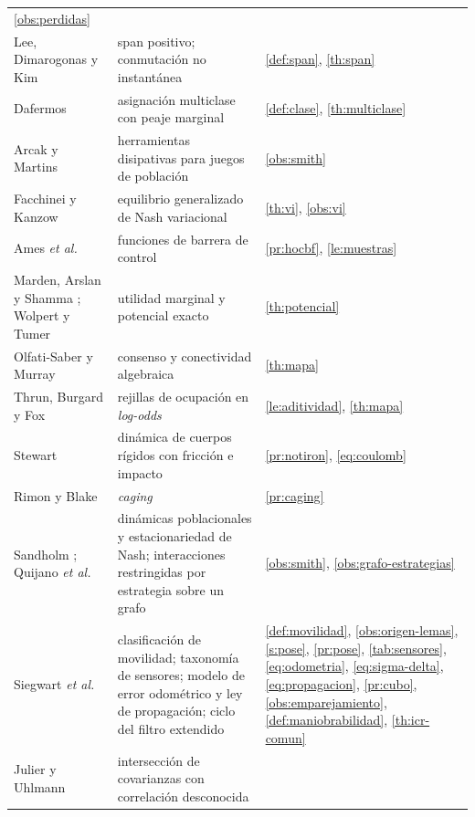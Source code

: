 \begin{table}[!ht]
\begin{tabularx}{\textwidth}{@{}p{4.6cm}p{3.5cm}X@{}}
    \cref{obs:perdidas} \\
Lee, Dimarogonas y Kim \cite{lee2026switching}
  & span positivo; conmutación no instantánea
  & \cref{def:span}, \cref{th:span} \\
Dafermos \cite{dafermos1972multiclass}
  & asignación multiclase con peaje marginal
  & \cref{def:clase}, \cref{th:multiclase} \\
Arcak y Martins \cite{arcak2021dissipativity}
  & herramientas disipativas para juegos de población
  & \cref{obs:smith} \\
Facchinei y Kanzow \cite{facchinei2007gne}
  & equilibrio generalizado de Nash variacional
  & \cref{th:vi}, \cref{obs:vi} \\
Ames \emph{et al.} \cite{ames2017cbf}
  & funciones de barrera de control
  & \cref{pr:hocbf}, \cref{le:muestras} \\
Marden, Arslan y Shamma \cite{marden2009cooperative};
Wolpert y Tumer \cite{wolpert1999collective}
  & utilidad marginal y potencial exacto
  & \cref{th:potencial} \\
Olfati-Saber y Murray \cite{olfatiSaber2004consensus}
  & consenso y conectividad algebraica
  & \cref{th:mapa} \\
Thrun, Burgard y Fox \cite{thrun2005probabilistic}
  & rejillas de ocupación en \emph{log-odds}
  & \cref{le:aditividad}, \cref{th:mapa} \\
Stewart \cite{stewart2000rigid}
  & dinámica de cuerpos rígidos con fricción e impacto
  & \cref{pr:notiron}, \eqref{eq:coulomb} \\
Rimon y Blake \cite{rimon1996caging}
  & \emph{caging}
  & \cref{pr:caging} \\
Sandholm \cite{sandholm2010population}; Quijano \emph{et al.} \cite{quijano2017role}
  & dinámicas poblacionales y estacionariedad de Nash; interacciones restringidas
    por estrategia sobre un grafo
  & \cref{obs:smith}, \cref{obs:grafo-estrategias} \\
Siegwart \emph{et al.} \cite{siegwart2011introduction}
  & clasificación de movilidad; taxonomía de sensores; modelo de error
    odométrico y ley de propagación; ciclo del filtro extendido
  & \cref{def:movilidad}, \cref{obs:origen-lemas}, \cref{s:pose},
    \cref{pr:pose}, \cref{tab:sensores}, \eqref{eq:odometria},
    \eqref{eq:sigma-delta}, \eqref{eq:propagacion}, \cref{pr:cubo},
    \cref{obs:emparejamiento}, \cref{def:maniobrabilidad}, \cref{th:icr-comun} \\
Julier y Uhlmann \cite{julier1997ci}
  & intersección de covarianzas con correlación desconocida

\end{tabularx}
\end{table}
